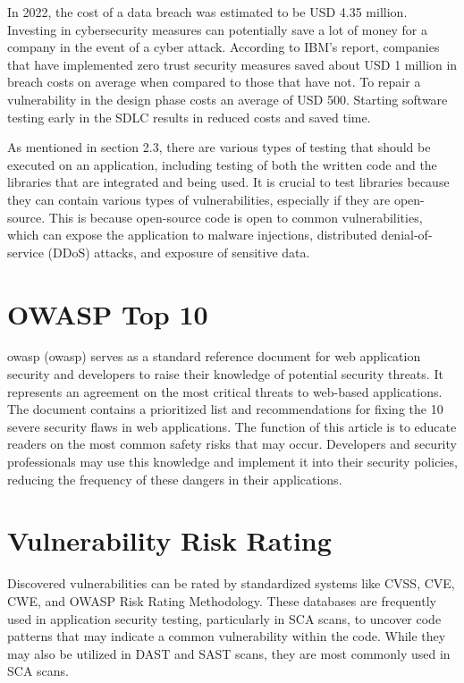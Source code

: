 In 2022, the cost of a data breach was estimated to be USD 4.35 million\cite{databreach}. Investing in cybersecurity measures can potentially save a lot of money for a company in the event of a cyber attack. According to IBM's report\cite{databreach}, companies that have implemented zero trust security measures saved about USD 1 million in breach costs on average when compared to those that have not. To repair a vulnerability in the design phase costs an average of USD 500\cite{fixvulnerability}. Starting software testing early in the SDLC results in reduced costs and saved time. 

As mentioned in section 2.3, there are various types of testing that should be executed on an application, including testing of both the written code and the libraries that are integrated and being used. It is crucial to test libraries because they can contain various types of vulnerabilities, especially if they are open-source. This is because open-source code is open to common vulnerabilities, which can expose the application to malware injections, distributed denial-of-service (DDoS) attacks, and exposure of sensitive data. \cite{testlibaries}

\section{OWASP Top 10}
\acrlong{owasp} (\acrshort{owasp}) serves as a standard reference document for web application security and developers to raise their knowledge of potential security threats. It represents an agreement on the most critical threats to web-based applications. The document contains a prioritized list and recommendations for fixing the 10 severe security flaws in web applications. The function of this article is to educate readers on the most common safety risks that may occur. Developers and security professionals may use this knowledge and implement it into their security policies, reducing the frequency of these dangers in their applications. 


\section{Vulnerability Risk Rating}
Discovered vulnerabilities can be rated by standardized systems like CVSS, CVE, CWE, and OWASP Risk Rating Methodology. These databases are frequently used in application security testing, particularly in SCA scans, to uncover code patterns that may indicate a common vulnerability within the code. While they may also be utilized in DAST and SAST scans, they are most commonly used in SCA scans. 


